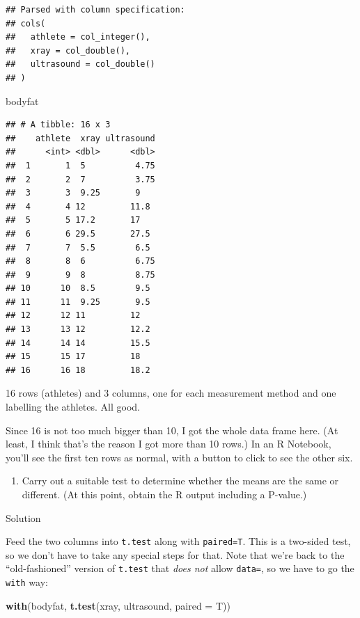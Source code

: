 \documentclass[]{tufte-book}
\newenvironment{Shaded}{}{}
\newcommand{\DataTypeTok}[1]{\textcolor[rgb]{0.56,0.13,0.00}{#1}}
\newcommand{\KeywordTok}[1]{\textcolor[rgb]{0.00,0.44,0.13}{\textbf{#1}}}
\newcommand{\NormalTok}[1]{#1}
\providecommand{\tightlist}{%
  \setlength{\itemsep}{0pt}\setlength{\parskip}{0pt}}
\theoremstyle{definition}
\theoremstyle{definition}
\theoremstyle{definition}
\theoremstyle{remark}
\begin{document}
\begin{verbatim}
## Parsed with column specification:
## cols(
##   athlete = col_integer(),
##   xray = col_double(),
##   ultrasound = col_double()
## )
\end{verbatim}

\begin{Shaded}
\begin{Highlighting}[]
\NormalTok{bodyfat}
\end{Highlighting}
\end{Shaded}

\begin{verbatim}
## # A tibble: 16 x 3
##    athlete  xray ultrasound
##      <int> <dbl>      <dbl>
##  1       1  5          4.75
##  2       2  7          3.75
##  3       3  9.25       9   
##  4       4 12         11.8 
##  5       5 17.2       17   
##  6       6 29.5       27.5 
##  7       7  5.5        6.5 
##  8       8  6          6.75
##  9       9  8          8.75
## 10      10  8.5        9.5 
## 11      11  9.25       9.5 
## 12      12 11         12   
## 13      13 12         12.2 
## 14      14 14         15.5 
## 15      15 17         18   
## 16      16 18         18.2
\end{verbatim}

16 rows (athletes) and 3 columns, one for each measurement method and
one labelling the athletes. All good.

Since 16 is not too much bigger than 10, I got the whole data frame
here. (At least, I think that's the reason I got more than 10 rows.) In
an R Notebook, you'll see the first ten rows as normal, with a button to
click to see the other six.

\begin{enumerate}
\def\labelenumi{(\alph{enumi})}
\setcounter{enumi}{2}
\tightlist
\item
  Carry out a suitable test to determine whether the means are the same
  or different. (At this point, obtain the R output including a
  P-value.)
\end{enumerate}

Solution

Feed the two columns into \texttt{t.test} along with \texttt{paired=T}.
This is a two-sided test, so we don't have to take any special steps for
that. Note that we're back to the ``old-fashioned'' version of
\texttt{t.test} that \emph{does not} allow \texttt{data=}, so we have to
go the \texttt{with} way:

\begin{Shaded}
\begin{Highlighting}[]
\KeywordTok{with}\NormalTok{(bodyfat, }\KeywordTok{t.test}\NormalTok{(xray, ultrasound, }\DataTypeTok{paired =}\NormalTok{ T))}
\end{Highlighting}
\end{Shaded}
\end{document}
